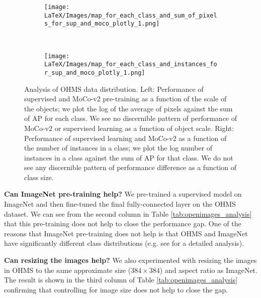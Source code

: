 \begin{figure*}[t!]
  \centering
  \begin{subfigure}[t]{0.48\textwidth}
   \centering
    \texttt{[image: LaTeX/Images/map\_for\_each\_class\_and\_sum\_of\_pixels\_for\_sup\_and\_moco\_plotly\_1.png]}
   
     \label{fig:scale_issue}
  \end{subfigure} 
  ~
  \begin{subfigure}[t]{0.48\linewidth}
   \centering
    \texttt{[image: LaTeX/Images/map\_for\_each\_class\_and\_instances\_for\_sup\_and\_moco\_plotly\_1.png]}
  \label{fig:long_tail_issue}
  \end{subfigure}
  \vspace{-0.3in}
    \caption{Analysis of OHMS data distribution. Left: Performance of supervised and MoCo-v2 pre-training as a function of the scale of the objects; we plot the log of the average of pixels against the sum of AP for each class. We see no discernible pattern of performance of MoCo-v2 or supervised learning as a function of object scale. Right: Performance of supervised learning and MoCo-v2 as a function of the number of instances in a class; we plot the log number of instances in a class against the sum of AP for that class. We do not see any discernible pattern of performance difference as a function of class size. \vspace{-10pt}}
\label{fig:issue_scale_long_tail}
\end{figure*}
\textbf{Can ImageNet pre-training help?}
 We pre-trained a supervised model on ImageNet and then fine-tuned the final fully-connected layer on the OHMS dataset. We can see from the second column in Table  \ref{tab:openimages_analysis} that this pre-training does not help to close the performance gap. One of the reasons that ImageNet pre-training does not help is that OHMS and ImageNet have significantly different class distributions (e.g. see \cite{li2019analysis} for a detailed analysis). %
 
\textbf{Can resizing the images help?}
We also experimented with resizing the images in OHMS to the same approximate size ($384 \times 384$) and aspect ratio as ImageNet. The result is shown in the third column of Table \ref{tab:openimages_analysis} confirming that controlling for image size does not help to close the gap. 

